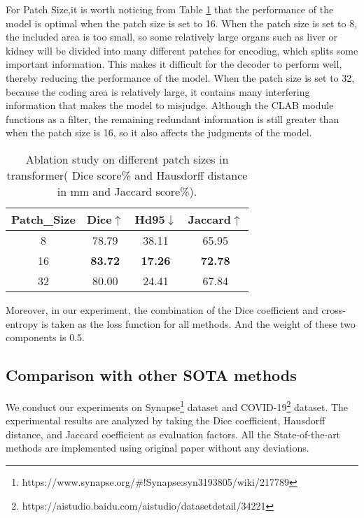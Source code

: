 \documentclass[runningheads]{llncs}
\begin{document}
For Patch Size,it is worth noticing from Table \ref{table7} that the performance of the model is optimal when the patch size is set to 16. When the patch size is set to 8, the included area is too small, so some relatively large organs such as liver or kidney will be divided into many different patches for encoding, which splits some important information. This makes it difficult for the decoder to perform well, thereby reducing the performance of the model. When the patch size is set to 32, because the coding area is relatively large, it contains many interfering information that makes the model to misjudge. Although the CLAB module functions as a filter, the remaining redundant information is still greater than when the patch size is 16, so it also affects the judgments of the model.
\begin{table}[H]\centering
\caption{Ablation study on different patch sizes in transformer( Dice score\% and Hausdorff distance in mm and Jaccard score\%).}
\label{table7}
\begin{tabular}{c|c|c|c}
\hline
    Patch\_Size & Dice$\uparrow$           & Hd95$\downarrow$           & Jaccard$\uparrow$        \\ \hline
    8           & 78.79          & 38.11          & 65.95          \\
    16          & \textbf{83.72} & \textbf{17.26} & \textbf{72.78} \\
    32          & 80.00          & 24.41          & 67.84         \\ \hline
    \end{tabular}
\end{table}

Moreover, in our experiment, the combination of the Dice coefficient and cross-entropy is taken as the loss function for all methods. And the weight of these two components is 0.5.

\subsection{Comparison with other SOTA methods}
\label{sec4.2}

We conduct our experiments on Synapse\footnote{https://www.synapse.org/\#!Synapse:syn3193805/wiki/217789} dataset and COVID-19\footnote{https://aistudio.baidu.com/aistudio/datasetdetail/34221} dataset. The experimental results are analyzed by taking the Dice coefficient, Hausdorff distance, and Jaccard coefficient as evaluation factors. All the State-of-the-art methods are implemented using original paper without any deviations.
\end{document}
